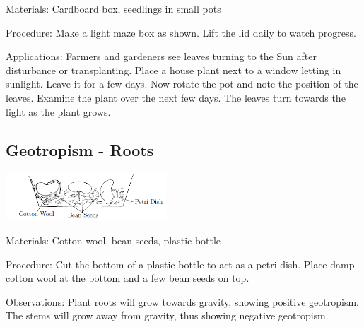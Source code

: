 \begin{multicols}{2}
\begin{description*}
\item[Materials:]{Cardboard box, seedlings in small pots}
\item[Procedure:]{Make a light maze box as shown. Lift the lid daily to watch progress.}
\item[Applications:]{Farmers and gardeners see leaves turning to the Sun after disturbance
or transplanting. Place a house plant next to a window letting in
sunlight. Leave it for a few days. Now rotate the pot and note the
position of the leaves. Examine the plant over the next few days. The
leaves turn towards the light as the plant grows.}
\end{description*}

\subsection{Geotropism - Roots}

\begin{center}
\includegraphics[width=0.45\textwidth]{./img/geotropism.png}
\end{center}

\begin{description*}
\item[Materials:]{Cotton wool, bean seeds, plastic bottle}
\item[Procedure:]{Cut the bottom of a plastic bottle to act as a petri dish. Place damp cotton wool at the bottom and a few bean seeds on top.}
\item[Observations:]{Plant roots will grow towards gravity, showing positive geotropism.
The stems will grow away from gravity, thus showing negative geotropism.}
\end{description*}


\end{multicols}
